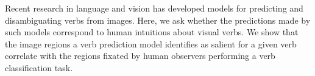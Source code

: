 Recent research in language and vision has developed models for predicting and disambiguating verbs from images. Here, we ask whether the predictions made by such models correspond to human intuitions about visual verbs. We show that the image regions a verb prediction model identifies as salient for a given verb correlate with the regions fixated by human observers performing a verb classification task.

